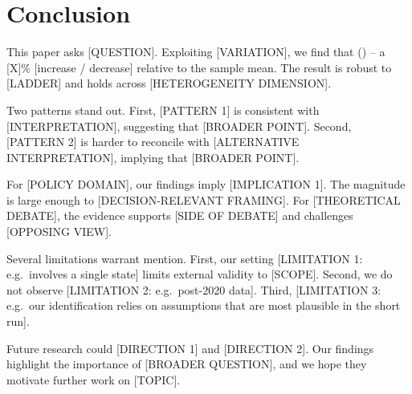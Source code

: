 
\section{Conclusion}\label{sec:conclusion}

This paper asks [QUESTION]. Exploiting [VARIATION], we find that
\headlineEstimate{} (\headlineSE{}) -- a [X]\% [increase / decrease]
relative to the sample mean. The result is robust to [LADDER] and
holds across [HETEROGENEITY DIMENSION].

Two patterns stand out. First, [PATTERN 1] is consistent with
[INTERPRETATION], suggesting that [BROADER POINT]. Second,
[PATTERN 2] is harder to reconcile with [ALTERNATIVE INTERPRETATION],
implying that [BROADER POINT].

For [POLICY DOMAIN], our findings imply [IMPLICATION 1]. The
magnitude is large enough to [DECISION-RELEVANT FRAMING].
For [THEORETICAL DEBATE], the evidence supports [SIDE OF DEBATE]
and challenges [OPPOSING VIEW].

Several limitations warrant mention. First, our setting
[LIMITATION 1: e.g.\ involves a single state] limits external
validity to [SCOPE]. Second, we do not observe [LIMITATION 2:
e.g.\ post-2020 data]. Third, [LIMITATION 3: e.g.\ our identification
relies on assumptions that are most plausible in the short run].

Future research could [DIRECTION 1] and [DIRECTION 2]. Our
findings highlight the importance of [BROADER QUESTION], and we
hope they motivate further work on [TOPIC].
